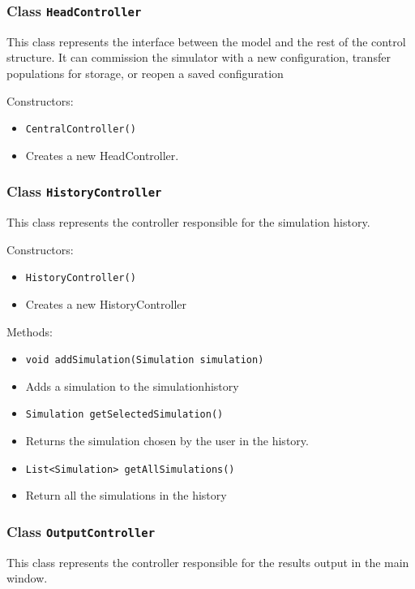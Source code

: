 \documentclass[parskip=full,11pt]{scrartcl}
\begin{document}
\subsubsection{Class \texttt{HeadController}}
This class represents the interface between the model and the rest of the control structure. It can commission the simulator with a new configuration, transfer populations for storage, or reopen a saved configuration

Constructors:
\begin{itemize}\itemsep -10pt
\item \texttt{CentralController()}
\item[] Creates a new HeadController.
\end{itemize}

\subsubsection{Class \texttt{HistoryController}}
This class represents the controller responsible for the simulation history.

Constructors:
\begin{itemize}\itemsep -10pt
\item \texttt{HistoryController()}
\item[] Creates a new HistoryController
\end{itemize}

Methods:
\begin{itemize}\itemsep -10pt
\item \texttt{void addSimulation(Simulation simulation)}
\item[] Adds a simulation to the simulationhistory

\item \texttt{Simulation getSelectedSimulation()}
\item[] Returns the simulation chosen by the user in the history.

\item \texttt{List<Simulation> getAllSimulations()}
\item[] Return all the simulations in the history
\end{itemize}

\subsubsection{Class \texttt{OutputController}}
This class represents the controller responsible for the results output in the main window.
\end{document}
